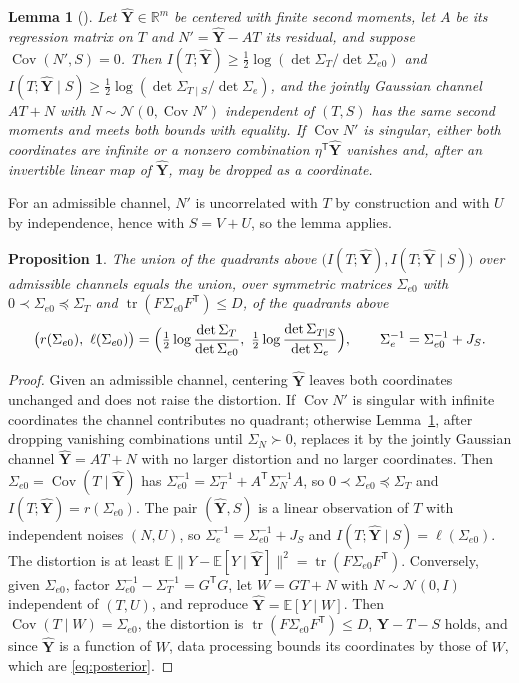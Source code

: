 \documentclass[11pt,onecolumn]{IEEEtran}
\newtheorem{proposition}[theorem]{Proposition}
\newtheorem{lemma}[theorem]{Lemma}
\newcommand{\E}{\mathbb{E}}
\newcommand{\R}{\mathbb{R}}
\newcommand{\tr}{\operatorname{tr}}
\newcommand{\Cov}{\operatorname{Cov}}
\newcommand{\hYv}{\hat{\mathbf Y}}
\begin{document}
\begin{lemma}[{\cite[Lemma~12 and Remark~13]{bond2026tit}}]
\label{lem:gauss}
Let $\hYv\in\R^m$ be centered with finite second moments, let $A$ be its regression
matrix on $T$ and $N'=\hYv-AT$ its residual, and suppose
$\Cov(N',S)=0$. Then
$I(T;\hYv)\ge\tfrac12\log(\det\Sigma_T/\det\Sigma_{e0})$ and
$I(T;\hYv\mid S)\ge\tfrac12\log(\det\Sigma_{T\mid S}/\det\Sigma_e)$, and the
jointly Gaussian channel $AT+N$ with $N\sim\mathcal N(0,\Cov N')$
independent of $(T,S)$ has the same second moments and meets both bounds
with equality. If $\Cov N'$ is singular, either both coordinates are
infinite or a nonzero combination $\eta^{\mathsf T}\hYv$ vanishes and, after an
invertible linear map of $\hYv$, may be dropped as a coordinate.
\end{lemma}

For an admissible channel, $N'$ is uncorrelated with $T$ by construction
and with $U$ by independence, hence with $S=V+U$, so the lemma applies.

\begin{proposition}\label{prop:posterior}
The union of the quadrants above
$\bigl(I(T;\hYv),I(T;\hYv\mid S)\bigr)$ over admissible channels equals
the union, over symmetric matrices $\Sigma_{e0}$ with
$0\prec\Sigma_{e0}\preceq\Sigma_T$ and $\tr(F\Sigma_{e0}F^{\mathsf T})\le D$,
of the quadrants above
\begin{equation}
\bigl(r(\Sigma_{e0}),\ \ell(\Sigma_{e0})\bigr)
=\Bigl(\tfrac12\log\frac{\det\Sigma_T}{\det\Sigma_{e0}},\
\tfrac12\log\frac{\det\Sigma_{T\mid S}}{\det\Sigma_e}\Bigr),
\qquad
\Sigma_e^{-1}=\Sigma_{e0}^{-1}+J_S .
\label{eq:posterior}
\end{equation}
\end{proposition}

\begin{proof}
Given an admissible channel, centering $\hYv$ leaves both coordinates
unchanged and does not raise the distortion. If $\Cov N'$ is singular with
infinite coordinates the channel contributes no quadrant; otherwise
Lemma~\ref{lem:gauss}, after dropping vanishing combinations until
$\Sigma_N\succ0$, replaces it by the jointly Gaussian channel $\hYv=AT+N$
with no larger distortion and no larger coordinates. Then
$\Sigma_{e0}=\Cov(T\mid\hYv)$ has
$\Sigma_{e0}^{-1}=\Sigma_T^{-1}+A^{\mathsf T}\Sigma_N^{-1}A$, so
$0\prec\Sigma_{e0}\preceq\Sigma_T$ and $I(T;\hYv)=r(\Sigma_{e0})$. The pair
$(\hYv,S)$ is a linear observation of $T$ with independent noises $(N,U)$,
so $\Sigma_e^{-1}=\Sigma_{e0}^{-1}+J_S$ and $I(T;\hYv\mid S)=\ell(\Sigma_{e0})$.
The distortion is at least $\E\|Y-\E[Y\mid\hYv]\|^2=\tr(F\Sigma_{e0}F^{\mathsf T})$.
Conversely, given $\Sigma_{e0}$, factor
$\Sigma_{e0}^{-1}-\Sigma_T^{-1}=G^{\mathsf T}G$, let $W=GT+N$ with
$N\sim\mathcal N(0,I)$ independent of $(T,U)$, and reproduce $\hYv=\E[Y\mid W]$. Then
$\Cov(T\mid W)=\Sigma_{e0}$, the distortion is
$\tr(F\Sigma_{e0}F^{\mathsf T})\le D$, $\hYv-T-S$ holds, and since $\hYv$
is a function of $W$, data processing bounds its coordinates by those of
$W$, which are \eqref{eq:posterior}.
\end{proof}
\end{document}
